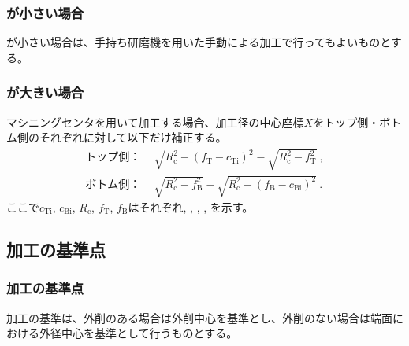 \subsubsection{\EndFaceInChamferLength が小さい場合}
\EndFaceInChamferLength が小さい場合は、手持ち研磨機を用いた手動による加工で行ってもよいものとする。

\subsubsection{\EndFaceInChamferLength が大きい場合}
マシニングセンタを用いて加工する場合、加工径の中心座標$X$をトップ側・ボトム側のそれぞれに対して以下だけ補正する。
\begin{align*}
  \text{トップ側：}&~~
  \sqrt{R_\mathrm c^2-\left(f_\mathrm T-c_\mathrm{Ti}\right)^2}-\sqrt{R_\mathrm c^2-f_\mathrm T^2}\ ,\\
  \text{ボトム側：}&~~
  \sqrt{R_\mathrm c^2-f_\mathrm B^2}-\sqrt{R_\mathrm c^2-\left(f_\mathrm B-c_\mathrm{Bi}\right)^2}\ .
\end{align*}
ここで$c_\mathrm{Ti}$, $c_\mathrm{Bi}$, $R_\mathrm c$, $f_\mathrm T$, $f_\mathrm B$はそれぞれ\TopEndFaceInChamferLength, \BottomEndFaceInChamferLength, \CenterCurvatureRadius, \TopAlocationLength, \BottomAlocationLength を示す。



\clearpage


\subsection{\EndFaceRoundChamfer 加工の基準点}

\subsubsection{\EndFaceOutRoundChamfer 加工の基準点}
\nameEndFaceOutRoundChamfer 加工の基準は、外削のある場合は外削中心を基準とし、外削のない場合は端面における外径中心を基準として行うものとする。

